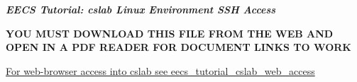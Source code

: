 \documentclass[12pt]{article}
\begin{document}

\begin{center}
\Huge{\bf \emph{EECS Tutorial: cslab Linux Environment SSH Access}} %

\bigskip %

\normalsize{\bf YOU MUST DOWNLOAD THIS FILE FROM THE WEB AND OPEN IN A PDF READER FOR DOCUMENT LINKS TO WORK}
\end{center}

\listofquestions %
\bigskip %
\href{https://github.com/benroose/tutorials/blob/master/cslab_tutorials/eecs_tutorial_cslab_web_access.pdf}{For web-browser access into cslab see eecs\_tutorial\_cslab\_web\_access}

\newpage %
\end{document}
